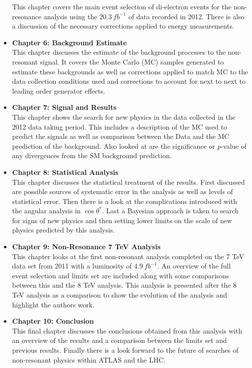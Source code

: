 \begin{itemize}
{This chapter covers the main event selection of di-electron events for the non-resonance analysis using the $20.3~fb^{-1}$ of data recorded in 2012. There is also a discussion of the necessary corrections applied to energy measurements.
}
\item{ 
{\bf Chapter 6: Background Estimate} \\
This chapter discusses the estimate of the background processes to the non-resonant signal. It covers the Monte Carlo (MC) samples generated to estimate these backgrounds as well as corrections applied to match MC to the data collection conditions used and corrections to account for next to next to leading order generator effects.
}
\item{ 
{\bf Chapter 7: Signal and Results} \\
This chapter shows the search for new physics in the data collected in the 2012 data taking period. This includes a description of the MC used to predict the signals as well as comparison between the Data and the MC prediction of the background. Also looked at are the significance or $p$-value of any divergences from the SM background prediction.
}
\item{ 
{\bf Chapter 8: Statistical Analysis} \\
This chapter discusses the statistical treatment of the results. First discussed are possible sources of systematic error in the analysis as well as levels of statistical error. Then there is a look at the complications introduced with the angular analysis in $\cos\theta^{*}$. Last a Bayesian approach is taken to search for signs of new physics and then setting lower limits on the scale of new physics predicted by this analysis.
}
\item{ 
{\bf Chapter 9: Non-Resonance 7 TeV Analysis} \\
This chapter looks at the first non-resonant analysis completed on the 7 TeV data set from 2011 with a luminosity of $4.9~fb^{-1}$. An overview of the full event selection and limits set are included along with some comparisons between this and the 8 TeV analysis. This analysis is presented after the 8 TeV analysis as a comparison to show the evolution of the analysis and highlight the authors work.
}
\item{ 
{\bf Chapter 10: Conclusion} \\
This final chapter discusses the conclusions obtained from this analysis with an overview of the results and a comparison between the limits set and previous results. Finally there is a look forward to the future of searches of non-resonant physics within ATLAS and the LHC.
}
\end{itemize}






